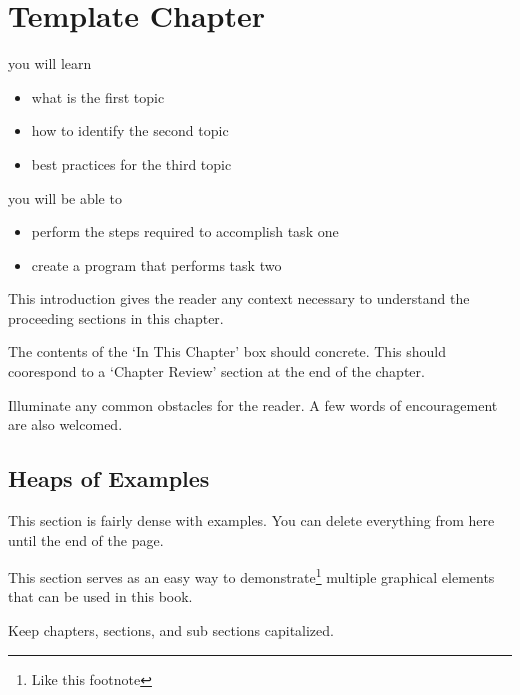 \setchapterpreamble[u]{\margintoc}
\chapter{Template Chapter}

%
\begin{kaobox}[frametitle=In This Chapter]
you will learn
\begin{itemize}
	\item what is the first topic
	\item how to identify the second topic
        \item best practices for the third topic
\end{itemize}

you will be able to
\begin{itemize}
        \item perform the steps required to accomplish task one
        \item create a program that performs task two
\end{itemize}
\end{kaobox}

This introduction gives the reader any context necessary to understand the 
proceeding sections in this chapter.

The contents of the `In This Chapter' box should concrete. This should coorespond to
a `Chapter Review' section at the end of the chapter.

Illuminate any common obstacles for the reader. A few words of encouragement are also welcomed.

%
\section{Heaps of Examples}
This section is fairly dense with examples. You can delete everything from here until
the end of the page.

This section serves as an easy way to demonstrate\footnote{Like this footnote} multiple 
graphical elements that can be used in this book.

Keep chapters, sections, and sub sections capitalized.


